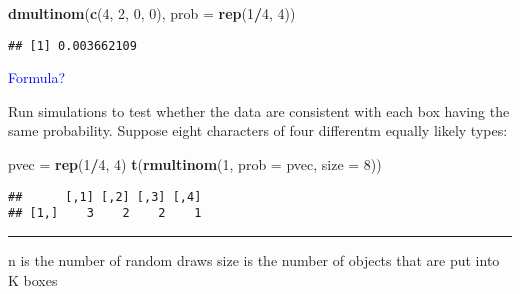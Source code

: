\documentclass[]{article}
\newenvironment{Shaded}{\begin{snugshade}}{\end{snugshade}}
\newcommand{\KeywordTok}[1]{\textcolor[rgb]{0.13,0.29,0.53}{\textbf{#1}}}
\newcommand{\DataTypeTok}[1]{\textcolor[rgb]{0.13,0.29,0.53}{#1}}
\newcommand{\DecValTok}[1]{\textcolor[rgb]{0.00,0.00,0.81}{#1}}
\newcommand{\StringTok}[1]{\textcolor[rgb]{0.31,0.60,0.02}{#1}}
\newcommand{\CommentTok}[1]{\textcolor[rgb]{0.56,0.35,0.01}{\textit{#1}}}
\newcommand{\OperatorTok}[1]{\textcolor[rgb]{0.81,0.36,0.00}{\textbf{#1}}}
\newcommand{\NormalTok}[1]{#1}
\let\oldrule=\rule
\renewcommand{\rule}[1]{\oldrule{\linewidth}}
\begin{document}
\begin{Shaded}
\begin{Highlighting}[]
\KeywordTok{dmultinom}\NormalTok{(}\KeywordTok{c}\NormalTok{(}\DecValTok{4}\NormalTok{, }\DecValTok{2}\NormalTok{, }\DecValTok{0}\NormalTok{, }\DecValTok{0}\NormalTok{), }\DataTypeTok{prob =} \KeywordTok{rep}\NormalTok{(}\DecValTok{1}\OperatorTok{/}\DecValTok{4}\NormalTok{, }\DecValTok{4}\NormalTok{))}
\end{Highlighting}
\end{Shaded}

\begin{verbatim}
## [1] 0.003662109
\end{verbatim}

\textcolor{blue}{Formula?}

Run simulations to test whether the data are consistent with each box
having the same probability. Suppose eight characters of four differentm
equally likely types:

\begin{Shaded}
\begin{Highlighting}[]
\NormalTok{pvec =}\StringTok{ }\KeywordTok{rep}\NormalTok{(}\DecValTok{1}\OperatorTok{/}\DecValTok{4}\NormalTok{, }\DecValTok{4}\NormalTok{)}
\KeywordTok{t}\NormalTok{(}\KeywordTok{rmultinom}\NormalTok{(}\DecValTok{1}\NormalTok{, }\DataTypeTok{prob =}\NormalTok{ pvec, }\DataTypeTok{size =} \DecValTok{8}\NormalTok{))}
\end{Highlighting}
\end{Shaded}

\begin{verbatim}
##      [,1] [,2] [,3] [,4]
## [1,]    3    2    2    1
\end{verbatim}

\begin{center}\rule{0.5\linewidth}{\linethickness}\end{center}


n is the number of random draws size is the number of objects that are
put into K boxes

\begin{Shaded}
\end{Shaded}
\end{document}
